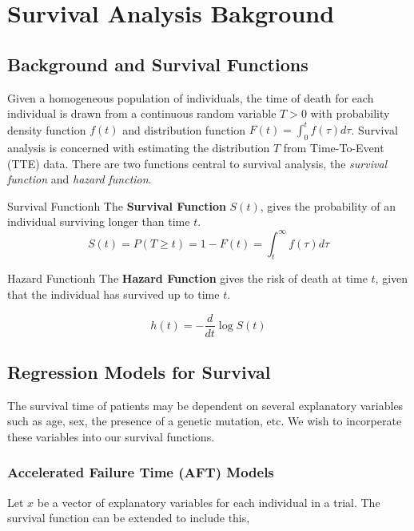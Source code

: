 \chapter{Survival Analysis Bakground}\label{survchap}

\section{Background and Survival Functions}

Given a homogeneous population of individuals, the time of death for each individual is drawn from a continuous random variable $T > 0$ with probability density function $f(t)$ and distribution function $F(t) = \int_{0}^{t}f(\tau)d\tau$. Survival analysis is concerned with estimating the distribution $T$ from Time-To-Event (TTE) data. There are two functions central to survival analysis, the \textit{survival function} and \textit{hazard function}.

\begin{definition}{Survival Function}{h}
    The \textbf{Survival Function} $S(t)$, gives the probability of an individual surviving longer than time $t$. 
    \[
        S(t) = P(T \geq  t) = 1 - F(t) = \int_{t}^{\infty}f(\tau)d\tau  
    \]
\end{definition}

\begin{definition}{Hazard Function}{h}
    The \textbf{Hazard Function} gives the risk of death at time $t$, given that the individual has survived up to time $t$. 
    
    \[
        h(t) = -\frac{d}{dt}\log S(t)  
    \]
\end{definition}

\section{Regression Models for Survival}

The survival time of patients may be dependent on several explanatory variables such as age, sex, the presence of a genetic mutation, etc. We wish to incorperate these variables into our survival functions.

\subsection{Accelerated Failure Time (AFT) Models}

Let $x$ be a vector of explanatory variables for each individual in a trial. The survival function can be extended to include this,

